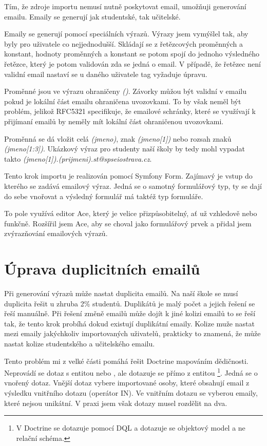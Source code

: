 Tím, že zdroje importu nemusí nutně poskytovat email, umožňuji generování emailu.
Emaily se generují jak studentské, tak učitelské.

Emaily se generují pomocí speciálních výrazů.
Výrazy jsem vymýšlel tak, aby byly pro uživatele co nejjednodušší.
Skládají se z řetězcových proměnných a konstant, hodnoty proměnných a konstant se potom spojí do jednoho výsledného řetězce, který je potom validován zda se jedná o email. V případě, že řetězec není validní email nastaví se u daného uživatele tag vyžaduje úpravu. 

Proměnné jsou ve výrazu ohraničeny \textit{()}. Závorky můžou být validní v emailu pokud je lokální část emailu ohraničena uvozovkami\cite{wiki-email-address}. To by však neměl být problém, jelikož RFC5321 specifikuje, že emailové schránky, které se využívají k přijímaní  emailů by neměly mít lokální část ohraničenou uvozovkami\cite{rfc5321}.

Proměnná se dá vložit celá \textit{(jmeno)}, znak \textit{(jmeno[1])} nebo rozsah znaků \textit{(jmeno[1:3])}.
Ukázkový výraz pro studenty naší školy by tedy mohl vypadat takto \textit{(jmeno[1]).(prijmeni).st@spseiostrava.cz}.

Tento krok importu je realizován pomocí Symfony Form. Zajímavý je vstup do kterého se zadává emailový výraz. Jedná se o samotný formulářový typ, ty se dají do sebe vnořovat a výsledný formulář má taktéž typ formuláře. 

To pole využívá editor Ace, který je velice přizpůsobitelný, ať už vzhledově nebo funkčně. Rozšířil jsem Ace, aby se choval jako formulářový prvek a přidal jsem zvýrazňování emailových výrazů.

\section{Úprava duplicitních emailů}\label{postup:deduplikace-emailu}

Při generování výrazů může nastat duplicita emailů.
Na naší škole se musí duplicita řešit u zhruba 2\% studentů.
Duplikátů je malý počet a jejich řešení se řeší manuálně.
Při řešení změně emailů může dojít k jiné kolizi emailů to se řeší tak, že tento krok probíhá dokud existují duplikátní emaily. Kolize muže nastat mezi emaily jakýchkoliv importovaných uživatelů, prakticky to znamená, že může nastat kolize studentského a učitelského emailu.

Tento problém mi z velké části pomáhá řešit Doctrine mapováním dědičnosti.
Neprovádí se dotaz s entitou  nebo , ale dotazuje se přímo z entitou \footnote{V Doctrine se dotazuje pomocí DQL a dotazuje se objektový model a ne relační schéma.}.
Jedná se o vnořený dotaz.
Vnější dotaz vybere importované osoby, které obsahují email z výsledku vnitřního dotazu (operátor \textsc{IN}).
Ve vnitřním dotazu se vyberou emaily, které nejsou unikátní. V praxi jsem však dotazy musel rozdělit na dva.

